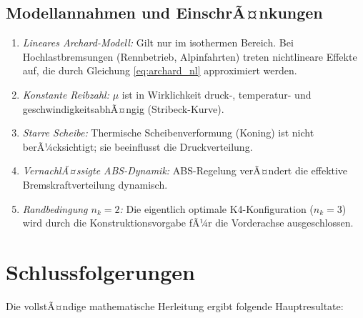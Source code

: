 ﻿\documentclass[12pt,a4paper]{article}
\theoremstyle{definition}
\begin{document}
\subsection{Modellannahmen und EinschrÃ¤nkungen}

\begin{enumerate}[leftmargin=2em]
  \item \textit{Lineares Archard-Modell:} Gilt nur im isothermen Bereich.
        Bei Hochlastbremsungen (Rennbetrieb, Alpinfahrten) treten
        nichtlineare Effekte auf, die durch Gleichung \eqref{eq:archard_nl}
        approximiert werden.
  \item \textit{Konstante Reibzahl:} $\mu$ ist in Wirklichkeit druck-,
        temperatur- und geschwindigkeitsabhÃ¤ngig (Stribeck-Kurve).
  \item \textit{Starre Scheibe:} Thermische Scheibenverformung (Koning)
        ist nicht berÃ¼cksichtigt; sie beeinflusst die Druckverteilung.
  \item \textit{VernachlÃ¤ssigte ABS-Dynamik:} ABS-Regelung verÃ¤ndert
        die effektive Bremskraftverteilung dynamisch.
  \item \textit{Randbedingung $n_k = 2$:} Die eigentlich optimale
        K4-Konfiguration ($n_k = 3$) wird durch die Konstruktions\-vorgabe
        fÃ¼r die Vorderachse ausgeschlossen.
\end{enumerate}

\section{Schlussfolgerungen}

Die vollstÃ¤ndige mathematische Herleitung ergibt folgende Hauptresultate:
\end{document}
